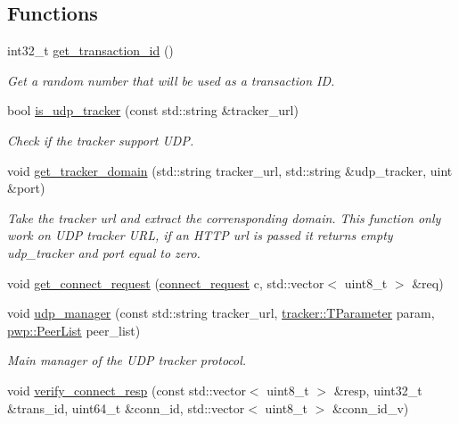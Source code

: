 \subsection*{Functions}
\begin{DoxyCompactItemize}
\item 
int32\+\_\+t \hyperlink{namespacet__udp_a8ff6ed3deaee00a35cc7afd4b37456d6}{get\+\_\+transaction\+\_\+id} ()
\begin{DoxyCompactList}\small\item\em Get a random number that will be used as a transaction ID. \end{DoxyCompactList}\item 
bool \hyperlink{namespacet__udp_af6fbd38370a6f5f7d8520144de7104c4}{is\+\_\+udp\+\_\+tracker} (const std\+::string \&tracker\+\_\+url)
\begin{DoxyCompactList}\small\item\em Check if the tracker support U\+DP. \end{DoxyCompactList}\item 
void \hyperlink{namespacet__udp_a0e87c0151a7bceaace19434206566199}{get\+\_\+tracker\+\_\+domain} (std\+::string tracker\+\_\+url, std\+::string \&udp\+\_\+tracker, uint \&port)
\begin{DoxyCompactList}\small\item\em Take the tracker url and extract the corrensponding domain. This function only work on U\+DP tracker U\+RL, if an H\+T\+TP url is passed it returns empty udp\+\_\+tracker and port equal to zero. \end{DoxyCompactList}\item 
void \hyperlink{namespacet__udp_adb2cdd5090cae67a7de482be4e281f23}{get\+\_\+connect\+\_\+request} (\hyperlink{structt__udp_1_1connect__request}{connect\+\_\+request} c, std\+::vector$<$ uint8\+\_\+t $>$ \&req)
\item 
void \hyperlink{namespacet__udp_af26a254f05566a7066b6930ad998a656}{udp\+\_\+manager} (const std\+::string tracker\+\_\+url, \hyperlink{structtracker_1_1TParameter}{tracker\+::\+T\+Parameter} param, \hyperlink{namespacepwp_ad07fa6df116b205302ad5ec172277184}{pwp\+::\+Peer\+List} peer\+\_\+list)
\begin{DoxyCompactList}\small\item\em Main manager of the U\+DP tracker protocol. \end{DoxyCompactList}\item 
void \hyperlink{namespacet__udp_af6b2788d8ce8ab98f367838a7e3b7b09}{verify\+\_\+connect\+\_\+resp} (const std\+::vector$<$ uint8\+\_\+t $>$ \&resp, uint32\+\_\+t \&trans\+\_\+id, uint64\+\_\+t \&conn\+\_\+id, std\+::vector$<$ uint8\+\_\+t $>$ \&conn\+\_\+id\+\_\+v)

\end{DoxyCompactItemize}
